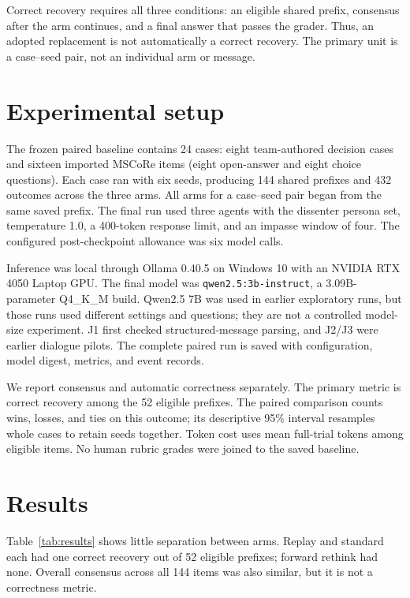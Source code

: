 \documentclass[11pt,a4paper,twocolumn]{article}
\begin{document}
Correct recovery requires all three conditions: an eligible shared prefix, consensus after the arm continues, and a final answer that passes the grader. Thus, an adopted replacement is not automatically a correct recovery. The primary unit is a case--seed pair, not an individual arm or message.

\section{Experimental setup}
The frozen paired baseline contains 24 cases: eight team-authored decision cases and sixteen imported MSCoRe items (eight open-answer and eight choice questions). Each case ran with six seeds, producing 144 shared prefixes and 432 outcomes across the three arms. All arms for a case--seed pair began from the same saved prefix. The final run used three agents with the dissenter persona set, temperature 1.0, a 400-token response limit, and an impasse window of four. The configured post-checkpoint allowance was six model calls.

Inference was local through Ollama 0.40.5 on Windows 10 with an NVIDIA RTX 4050 Laptop GPU. The final model was \texttt{qwen2.5:3b-instruct}, a 3.09B-parameter Q4\_K\_M build. Qwen2.5 7B was used in earlier exploratory runs, but those runs used different settings and questions; they are not a controlled model-size experiment. J1 first checked structured-message parsing, and J2/J3 were earlier dialogue pilots. The complete paired run is saved with configuration, model digest, metrics, and event records.

We report consensus and automatic correctness separately. The primary metric is correct recovery among the 52 eligible prefixes. The paired comparison counts wins, losses, and ties on this outcome; its descriptive 95\% interval resamples whole cases to retain seeds together. Token cost uses mean full-trial tokens among eligible items. No human rubric grades were joined to the saved baseline.

\section{Results}
Table~\ref{tab:results} shows little separation between arms. Replay and standard each had one correct recovery out of 52 eligible prefixes; forward rethink had none. Overall consensus across all 144 items was also similar, but it is not a correctness metric.
\end{document}
